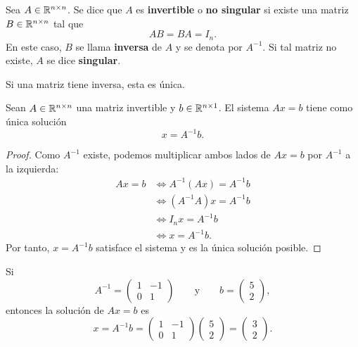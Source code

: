 \documentclass[compacto,10pt]{pubciencias-notas}
\begin{document}
\setcounter{defi}{3}
\begin{defi}\label{sem04cl01:def-inversa}
    Sea $A\in\Mat[\R]{n}{n}$. Se dice que $A$ es \textbf{invertible} o
    \textbf{no singular} si existe una matriz $B\in\Mat[\R]{n}{n}$ tal que
    \[
        AB=BA=I_n.
    \]
    En este caso, $B$ se llama \textbf{inversa} de $A$ y se denota por
    $A^{-1}$. Si tal matriz no existe, $A$ se dice \textbf{singular}.
\end{defi}


\begin{prop}
    Si una matriz tiene inversa, esta es única.
\end{prop}

\begin{teo}\label{sem04cl01:teo-solucion-inversa}
    Sean $A\in\Mat[\R]{n}{n}$ una matriz invertible y
    $b\in\Mat[\R]{n}{1}$. El sistema $Ax=b$ tiene como única solución
    \[
        x=A^{-1}b.
    \]
\end{teo}

\begin{proof}
    Como $A^{-1}$ existe, podemos multiplicar ambos lados de $Ax=b$ por
    $A^{-1}$ a la izquierda:
    \begin{align*}
        Ax=b
        &\Longleftrightarrow A^{-1}(Ax)=A^{-1}b\\
        &\Longleftrightarrow (A^{-1}A)x=A^{-1}b\\
        &\Longleftrightarrow I_nx=A^{-1}b\\
        &\Longleftrightarrow x=A^{-1}b.
    \end{align*}
    Por tanto, $x=A^{-1}b$ satisface el sistema y es la única solución posible.
\end{proof}

\begin{ejem}
    Si
    \[
        A^{-1}=\begin{pmatrix}1&-1\\0&1\end{pmatrix}
        \qquad\text{y}\qquad
        b=\begin{pmatrix}5\\2\end{pmatrix},
    \]
    entonces la solución de $Ax=b$ es
    \[
        x=A^{-1}b
        =\begin{pmatrix}1&-1\\0&1\end{pmatrix}
         \begin{pmatrix}5\\2\end{pmatrix}
        =\begin{pmatrix}3\\2\end{pmatrix}.
    \]
\end{ejem}
\end{document}

